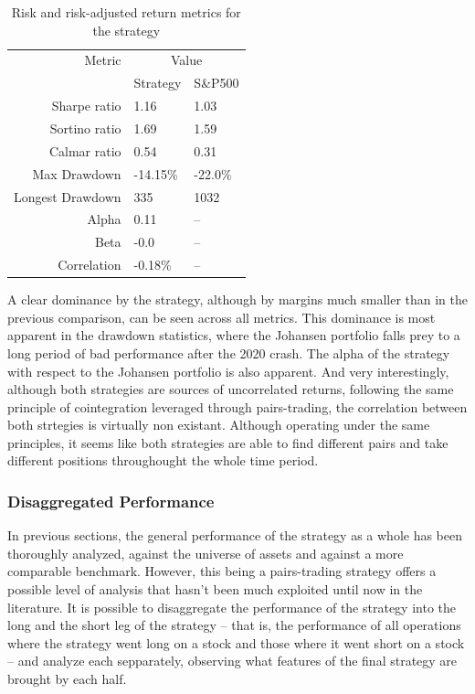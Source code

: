 \begin{table}[ht]
    \centering
    \begin{tabular}{rll}
        \toprule
        Metric & \multicolumn{2}{c}{Value} \\ 
        \cmidrule(lr){2-3}
            & Strategy & S\&P500 \\
        \midrule
        Sharpe ratio & 1.16 & 1.03 \\
        Sortino ratio & 1.69 & 1.59 \\
        Calmar ratio & 0.54 & 0.31 \\
        Max Drawdown & -14.15\% & -22.0\% \\
        Longest Drawdown & 335 & 1032 \\
        Alpha & 0.11 & -- \\
        Beta & -0.0 & -- \\
        Correlation & -0.18\% & -- \\
        \bottomrule
    \end{tabular}
    \caption{Risk and risk-adjusted return metrics for the strategy}
    \label{table:risk-adjusted-strat-vs-johansen}
\end{table}

A clear dominance by the strategy, although by margins much smaller than in the previous comparison, can be seen across all metrics. This dominance is most apparent in the drawdown statistics, where the Johansen portfolio falls prey to a long period of bad performance after the 2020 crash. The alpha of the strategy with respect to the Johansen portfolio is also apparent. And very interestingly, although both strategies are sources of uncorrelated returns, following the same principle of cointegration leveraged through pairs-trading, the correlation between both strtegies is virtually non existant. Although operating under the same principles, it seems like both strategies are able to find different pairs and take different positions throughought the whole time period.

\subsubsection{Disaggregated Performance}
In previous sections, the general performance of the strategy as a whole has been thoroughly analyzed, against the universe of assets and against a more comparable benchmark. However, this being a pairs-trading strategy offers a possible level of analysis that hasn't been much exploited until now in the literature. It is possible to disaggregate the performance of the strategy into the long and the short leg of the strategy -- that is, the performance of all operations where the strategy went long on a stock and those where it went short on a stock -- and analyze each sepparately, observing what features of the final strategy are brought by each half. 

